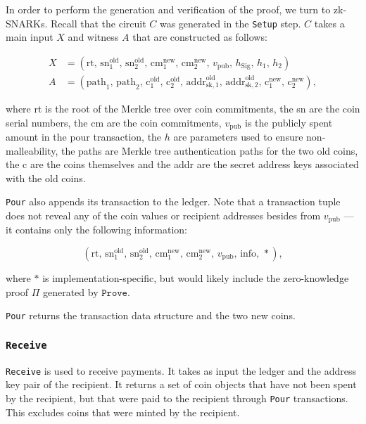 \documentclass{article}
\begin{document}
In order to perform the generation and verification of the proof, we turn to zk-SNARKs. Recall that the circuit $C$ was generated in the \texttt{Setup} step. $C$ takes a main input $X$ and witness $A$ that are constructed as follows:

\begin{align}
X &= \left( \text{rt}, \, {\text{sn}}^{\text{old}}_1, \, {\text{sn}}^{\text{old}}_2, \, {\text{cm}}^{\text{new}}_1, \, {\text{cm}}^{\text{new}}_2, \, v_{\text{pub}}, \, h_{\text{Sig}}, \, h_1, \, h_2 \right) \\ 
A &= \left( \text{path}_1, \, \text{path}_2, \, {\text{c}}^{\text{old}}_1, \, {\text{c}}^{\text{old}}_2, \, {\text{addr}}^{\text{old}}_{\text{sk}, 1}, \, {\text{addr}}^{\text{old}}_{\text{sk}, 2}, \, {\text{c}}^{\text{new}}_1, \, {\text{c}}^{\text{new}}_2 \right),
\end{align}
\newline

where rt is the root of the Merkle tree over coin commitments, the sn are the coin serial numbers, the cm are the coin commitments, $v_{\text{pub}}$ is the publicly spent amount in the pour transaction, the $h$ are parameters used to ensure non-malleability, the paths are Merkle tree authentication paths for the two old coins, the c are the coins themselves and the addr are the secret address keys associated with the old coins.

\texttt{Pour} also appends its transaction to the ledger. Note that a transaction tuple does not reveal any of the coin values or recipient addresses besides from $v_{\text{pub}}$ --- it contains only the following information: 

\begin{equation}
\left(\text{rt}, \, {\text{sn}}^{\text{old}}_1, \, {\text{sn}}^{\text{old}}_2, \, {\text{cm}}^{\text{new}}_1, \, {\text{cm}}^{\text{new}}_2, \, v_{\text{pub}}, \, \text{info}, \, *\right),
\end{equation}


where $*$ is implementation-specific, but would likely include the zero-knowledge proof $\Pi$ generated by $\texttt{Prove}$.

\texttt{Pour} returns the transaction data structure and the two new coins.

\subsubsection{\texttt{Receive}}
\texttt{Receive} is used to receive payments. It takes as input the ledger and the address key pair of the recipient. It returns a set of coin objects that have not been spent by the recipient, but that were paid to the recipient through \texttt{Pour} transactions. This excludes coins that were minted by the recipient.
\end{document}

